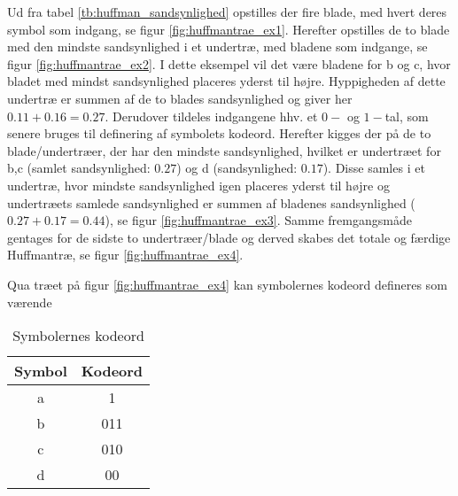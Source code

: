 Ud fra tabel \vref{tb:huffman_sandsynlighed} opstilles der fire blade, med hvert deres symbol som indgang, se figur \vref{fig:huffmantrae_ex1}. Herefter opstilles de to blade med den mindste sandsynlighed i et undertræ, med bladene som indgange, se figur \vref{fig:huffmantrae_ex2}. I dette eksempel vil det være bladene for b og c, hvor bladet med mindst sandsynlighed placeres yderst til højre. Hyppigheden af dette undertræ er summen af de to blades sandsynlighed og giver her $0.11+0.16=0.27$. Derudover tildeles indgangene hhv. et $0-$ og $1-$tal, som senere bruges til definering af symbolets kodeord. Herefter kigges der på de to blade/undertræer, der har den mindste sandsynlighed, hvilket er undertræet for b,c (samlet sandsynlighed: $0.27$) og d (sandsynlighed: $0.17$). Disse samles i et undertræ, hvor mindste sandsynlighed igen placeres yderst til højre og undertræets samlede sandsynlighed er summen af bladenes sandsynlighed ($0.27+0.17=0.44$), se figur \vref{fig:huffmantrae_ex3}. Samme fremgangsmåde gentages for de sidste to undertræer/blade og derved skabes det totale og færdige Huffmantræ, se figur \vref{fig:huffmantrae_ex4}.

Qua træet på figur \vref{fig:huffmantrae_ex4} kan symbolernes kodeord defineres som værende
\begin{table}[!h]
\centering
\begin{tabular}{|c|c|} 
\hline
\textbf{Symbol}	&	\textbf{Kodeord}	\\ \hline
a		&	1	\\ \hline
b		&	011	\\ \hline
c		&	010	\\ \hline
d		&	00	\\ \hline
\end{tabular}
\caption{Symbolernes kodeord}
\label{tb:huffman_ex}
\end{table}
